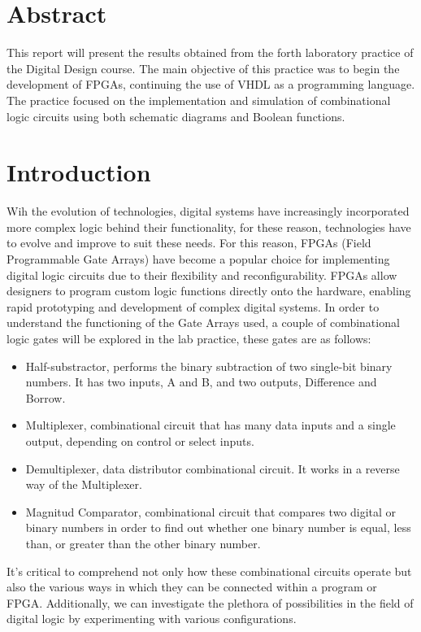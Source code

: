 \documentclass[12pt]{article}  %
\begin{document}
\section{Abstract} %
This report will present the results obtained from the forth laboratory practice of the Digital Design course. The main objective of this practice was to begin the development of
FPGAs, continuing the use of VHDL as a programming language. The practice focused on the implementation and simulation of combinational logic circuits using both schematic diagrams and Boolean functions. 
\section{Introduction} %
Wih the evolution of technologies, digital systems have increasingly incorporated more complex logic behind their functionality, for these reason, technologies have to evolve and improve to suit these needs.
For this reason, FPGAs (Field Programmable Gate Arrays) have become a popular choice for implementing digital logic circuits due to their flexibility and reconfigurability. FPGAs allow designers to program custom logic functions directly onto the hardware, enabling rapid prototyping and development of complex digital systems.
In order to understand the functioning of the Gate Arrays used, a couple of combinational logic gates will be explored in the lab practice, these gates are as follows:
\begin{itemize}
  \item Half-substractor, performs the binary subtraction of two single-bit binary numbers. It has two inputs, A and B, and two outputs, Difference and Borrow.
  \item Multiplexer, combinational circuit that has many data inputs and a single output, depending on control or select inputs.
  \item Demultiplexer, data distributor combinational circuit. It works in a reverse way of the Multiplexer.
  \item Magnitud Comparator, combinational circuit that compares two digital or binary numbers in order to find out whether one binary number is equal, less than, or greater than the other binary number.
\end{itemize}\cite{GfGCombinational}
It's critical to comprehend not only how these combinational circuits operate but also the various ways in which they can be connected within a program or FPGA. Additionally, we can investigate the plethora of possibilities in the field of digital logic by experimenting with various configurations.
\end{document}
